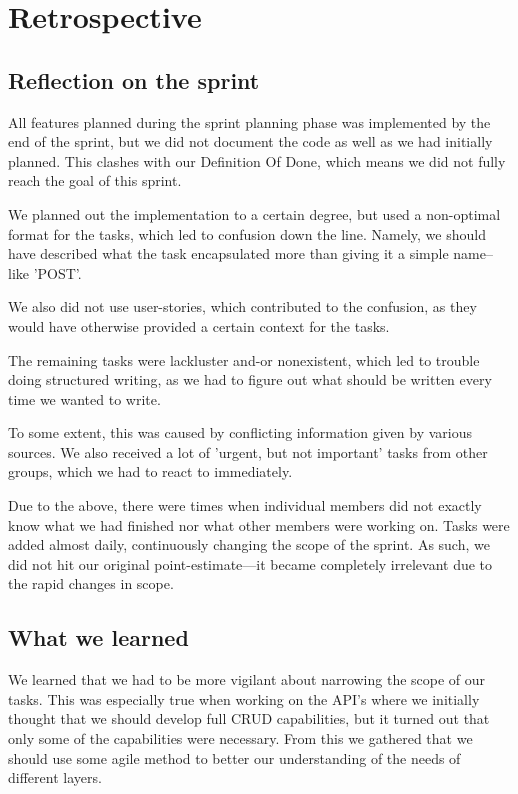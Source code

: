 \section{Retrospective}

\subsection{Reflection on the sprint}
All features planned during the sprint planning phase was implemented by the end of the sprint, but we did not document the code as well as we had initially planned. 
This clashes with our Definition Of Done, which means we did not fully reach the goal of this sprint. 

We planned out the implementation to a certain degree, but used a non-optimal format for the tasks, which led to confusion down the line. Namely, we should have described what the task encapsulated more than giving it a simple name--like 'POST'. 

We also did not use user-stories, which contributed to the confusion, as they would have otherwise provided a certain context for the tasks.

The remaining tasks were lackluster and-or nonexistent, which led to trouble doing structured writing, as we had to figure out what should be written every time we wanted to write.
    
To some extent, this was caused by conflicting information given by various sources. We also received a lot of 'urgent, but not important' tasks from other groups, which we had to react to immediately.
    
Due to the above, there were times when individual members did not exactly know what we had finished nor what other members were working on. Tasks were added almost daily, continuously changing the scope of the sprint.
As such, we did not hit our original point-estimate---it became completely irrelevant due to the rapid changes in scope.

\subsection{What we learned}\label{Whatwelearnedsprint3}
We learned that we had to be more vigilant about narrowing the scope of our tasks. 
This was especially true when working on the API's where we initially thought that we should develop full CRUD capabilities, but it turned out that only some of the capabilities were necessary. 
From this we gathered that we should use some agile method to better our understanding of the needs of different layers.

